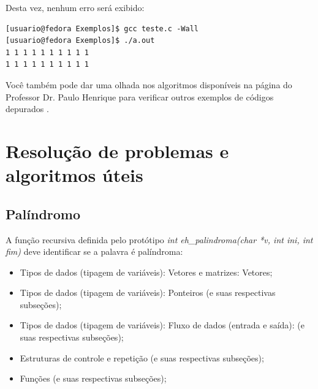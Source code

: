\documentclass[12pt]{article}
\newcommand\tab[1][1cm]{\hspace*{#1}}
\begin{document}
\par\tab Desta vez, nenhum erro será exibido:

\hspace{0.25cm}
\begin{tcolorbox}[colback=black!5!white,colframe=black!75!white,title=Console: usuario@fedora:\~/Exemplos]
    \begin{verbatim}
[usuario@fedora Exemplos]$ gcc teste.c -Wall
[usuario@fedora Exemplos]$ ./a.out
1 1 1 1 1 1 1 1 1 1 
1 1 1 1 1 1 1 1 1 1 
    \end{verbatim}
\end{tcolorbox}

\hspace{0.25cm}
\begin{tcolorbox}[colback=blue!5!white,colframe=blue!75!black,title=Dica!]
  \par\tab Você também pode dar uma olhada nos algoritmos disponíveis na página do Professor Dr. Paulo Henrique para verificar outros exemplos de códigos depurados \cite{site:debug_c}.
\end{tcolorbox}

\newpage
\section{Resolução de problemas e algoritmos úteis}

\subsection{Palíndromo}

\par\tab A função recursiva definida pelo protótipo \textit{int eh\_palindroma(char *v, int ini, int fim)} deve identificar se a palavra é palíndroma:

\hspace{0.25cm}
\begin{tcolorbox}[colback=violet!5!white,colframe=violet!75!white,title=Capítulos recomendados:]
    \begin{itemize}
        \item Tipos de dados (tipagem de variáveis): Vetores e matrizes: Vetores;
        \item Tipos de dados (tipagem de variáveis): Ponteiros (e suas respectivas subseções);
        \item Tipos de dados (tipagem de variáveis): Fluxo de dados (entrada e saída): (e suas respectivas subseções);
        \item Estruturas de controle e repetição (e suas respectivas subseções);
        \item Funções (e suas respectivas subseções);
    \end{itemize}
\end{tcolorbox}
\end{document}
